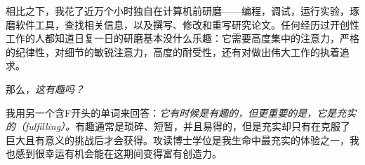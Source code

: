 \documentclass[letter,12pt]{book}
\begin{document}
\begin{CJK}{UTF8}{gbsn}
相比之下，我花了近万个小时独自在计算机前研磨——编程，调试，运行实验，琢磨软件工具，查找相关信息，以及撰写、修改和重写研究论文。任何经历过开创性工作的人都知道日复一日的研磨基本没什么乐趣：它需要高度集中的注意力，严格的纪律性，对细节的敏锐注意力，高度的耐受性，还有对做出伟大工作的执着追求。

那么，\emph{这有趣吗？}

我用另一个含F开头的单词来回答：\emph{它有时候是有趣的，但更重要的是，它是充实的（fulfilling）。}有趣通常是琐碎、短暂，并且易得的，但是充实却只有在克服了巨大且有意义的挑战后才会获得。攻读博士学位是我生命中最充实的体验之一，我也感到很幸运有机会能在这期间变得富有创造力。

\clearpage
\clearpage

\end{CJK}
\end{document}
